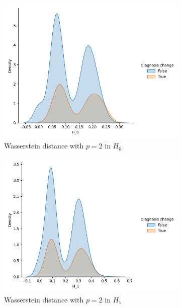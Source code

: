 \documentclass{article}
\begin{document}
\begin{figure}
  \centering
  \begin{subfigure}{0.32\textwidth}
    \includegraphics[width=\textwidth]{figures/temporal_evolution/wasserstein_H_0_dist_diag_change.png}
    \caption{Wasserstein distance with $p=2$ in $H_0$}
  \end{subfigure}
  \begin{subfigure}{0.32\textwidth}
    \includegraphics[width=\textwidth]{figures/temporal_evolution/wasserstein_H_1_dist_diag_change.png}
    \caption{Wasserstein distance with $p=2$ in $H_1$}
  \end{subfigure}
  \begin{subfigure}{0.32\textwidth}

\end{subfigure}
\end{figure}
\end{document}
